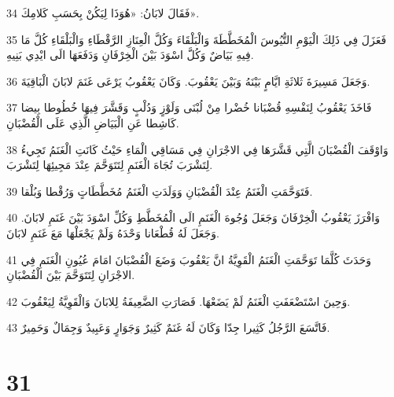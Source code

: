 \par 34 فَقَالَ لابَانُ: «هُوَذَا لِيَكُنْ بِحَسَبِ كَلامِكَ».
\par 35 فَعَزَلَ فِي ذَلِكَ الْيَوْمِ التُّيُوسَ الْمُخَطَّطَةَ وَالْبَلْقَاءَ وَكُلَّ الْعِنَازِ الرَّقْطَاءِ وَالْبَلْقَاءِ كُلَّ مَا فِيهِ بَيَاضٌ وَكُلَّ اسْوَدَ بَيْنَ الْخِرْفَانِ وَدَفَعَهَا الَى ايْدِي بَنِيهِ.
\par 36 وَجَعَلَ مَسِيرَةَ ثَلاثَةِ ايَّامٍ بَيْنَهُ وَبَيْنَ يَعْقُوبَ. وَكَانَ يَعْقُوبُ يَرْعَى غَنَمَ لابَانَ الْبَاقِيَةَ.
\par 37 فَاخَذَ يَعْقُوبُ لِنَفْسِهِ قُضْبَانا خُضْرا مِنْ لُبْنَى وَلَوْزٍ وَدُلْبٍ وَقَشَّرَ فِيهَا خُطُوطا بِيضا كَاشِطا عَنِ الْبَيَاضِ الَّذِي عَلَى الْقُضْبَانِ.
\par 38 وَاوْقَفَ الْقُضْبَانَ الَّتِي قَشَّرَهَا فِي الاجْرَانِ فِي مَسَاقِي الْمَاءِ حَيْثُ كَانَتِ الْغَنَمُ تَجِيءُ لِتَشْرَبَ تُجَاهَ الْغَنَمِ لِتَتَوَحَّمَ عِنْدَ مَجِيئِهَا لِتَشْرَبَ.
\par 39 فَتَوَحَّمَتِ الْغَنَمُ عِنْدَ الْقُضْبَانِ وَوَلَدَتِ الْغَنَمُ مُخَطَّطَاتٍ وَرُقْطا وَبُلْقا.
\par 40 وَافْرَزَ يَعْقُوبُ الْخِرْفَانَ وَجَعَلَ وُجُوهَ الْغَنَمِ الَى الْمُخَطَّطِ وَكُلِّ اسْوَدَ بَيْنَ غَنَمِ لابَانَ. وَجَعَلَ لَهُ قُطْعَانا وَحْدَهُ وَلَمْ يَجْعَلْهَا مَعَ غَنَمِ لابَانَ.
\par 41 وَحَدَثَ كُلَّمَا تَوَحَّمَتِ الْغَنَمُ الْقَوِيَّةُ انَّ يَعْقُوبَ وَضَعَ الْقُضْبَانَ امَامَ عُيُونِ الْغَنَمِ فِي الاجْرَانِ لِتَتَوَحَّمَ بَيْنَ الْقُضْبَانِ.
\par 42 وَحِينَ اسْتَضْعَفَتِ الْغَنَمُ لَمْ يَضَعْهَا. فَصَارَتِ الضَّعِيفَةُ لِلابَانَ وَالْقَوِيَّةُ لِيَعْقُوبَ.
\par 43 فَاتَّسَعَ الرَّجُلُ كَثِيرا جِدّا وَكَانَ لَهُ غَنَمٌ كَثِيرٌ وَجَوَارٍ وَعَبِيدٌ وَجِمَالٌ وَحَمِيرٌ.

\chapter{31}

